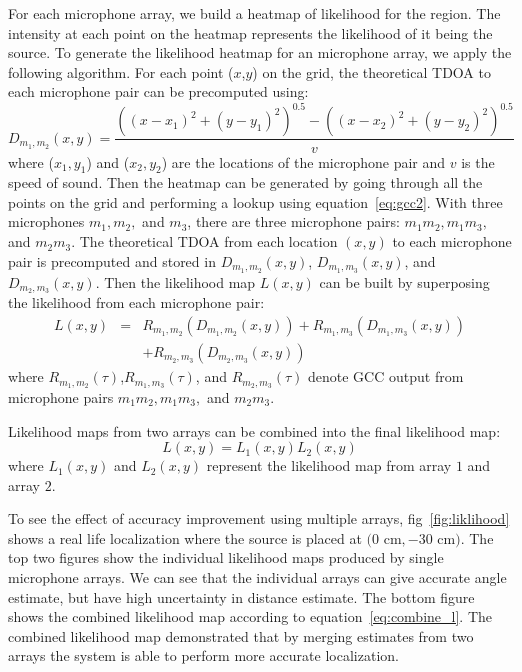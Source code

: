 For each microphone array, we build a heatmap of likelihood for the region. The intensity at each point on the heatmap represents the likelihood of it being the source. To generate the likelihood heatmap for an microphone array, we apply the following algorithm. For each point ($x$,$y$) on the grid, the theoretical TDOA to each microphone pair can be precomputed using:
\[
 D_{m_1,m_2}(x,y) =  \frac{((x-x_1)^2 + (y-y_1)^2)^{0.5} - ((x-x_2)^2 + (y-y_2)^2)^{0.5}}{v}
\]
where ($x_1, y_1$) and ($x_2, y_2$) are the locations of the microphone pair and $v$ is the speed of sound. Then the heatmap can be generated by going through all the points on the grid and performing a lookup using equation~\ref{eq:gcc2}. With three microphones $m_1,m_2,$ and $m_3$, there are three microphone pairs: $m_1m_2,m_1m_3,$ and $m_2m_3$. The theoretical TDOA from each location $(x,y)$ to each microphone pair is precomputed and stored in $D_{m_1,m_2}(x,y)$, $D_{m_1,m_3}(x,y)$, and $D_{m_2,m_3}(x,y)$. Then the likelihood map $L(x,y)$ can be built by superposing the likelihood from each microphone pair:
\begin{eqnarray*}
L(x,y) &=& R_{m_1,m_2}(D_{m_1,m_2}(x,y)) + R_{m_1,m_3}(D_{m_1,m_3}(x,y)) \\
 & & +R_{m_2,m_3}(D_{m_2,m_3}(x,y)) 
\end{eqnarray*}
where $R_{m_1,m_2}(\tau)$,$R_{m_1,m_3}(\tau)$, and $R_{m_2,m_3}(\tau)$ denote GCC output from microphone pairs $m_1m_2,m_1m_3,$ and $m_2m_3$.

Likelihood maps from two arrays can be combined into the final likelihood map:
\begin{equation}\label{eq:combine_l}
L(x,y) = L_1(x,y) L_2(x,y)
\end{equation}
where $L_1(x,y)$ and $L_2(x,y)$ represent the likelihood map from array $1$ and array $2$.



To see the effect of accuracy improvement using multiple arrays, fig~\ref{fig:liklihood} shows a real life localization where the source is placed at $(0$ cm$,-30$ cm$)$. The top two figures show the individual likelihood maps produced by single microphone arrays. We can see that the individual arrays can give accurate angle estimate, but have high uncertainty in distance estimate. The bottom figure shows the combined likelihood map according to equation~\ref{eq:combine_l}. The combined likelihood map demonstrated that by merging estimates from two arrays the system is able to perform more accurate localization. 

